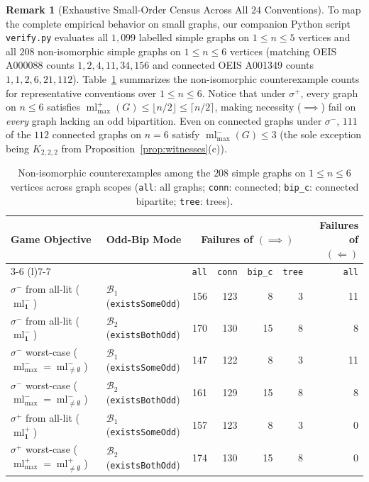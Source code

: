 \documentclass[11pt,a4paper]{article}
\theoremstyle{definition}
\newtheorem{remark}[theorem]{Remark}
\newcommand{\ml}{\operatorname{ml}}
\newcommand{\ceilhalf}[1]{\lceil #1 / 2 \rceil}
\newcommand{\floorhalf}[1]{\lfloor #1 / 2 \rfloor}
\begin{document}
\begin{remark}[Exhaustive Small-Order Census Across All $24$ Conventions]
To map the complete empirical behavior on small graphs, our companion Python script
\texttt{verify.py} evaluates all $1{,}099$ labelled simple graphs on $1 \le n \le 5$
vertices and all $208$ non-isomorphic simple graphs on $1 \le n \le 6$ vertices
(matching OEIS A000088 counts $1, 2, 4, 11, 34, 156$ and connected OEIS A001349
counts $1, 1, 2, 6, 21, 112$). Table~\ref{tab:census} summarizes the non-isomorphic
counterexample counts for representative conventions over $1 \le n \le 6$. Notice
that under $\sigma^+$, every graph on $n \le 6$ satisfies $\ml_{\max}^+(G) \le \floorhalf{n} \le \ceilhalf{n}$,
making necessity ($\implies$) fail on \emph{every} graph lacking an odd bipartition.
Even on connected graphs under $\sigma^-$, $111$ of the $112$ connected graphs on
$n = 6$ satisfy $\ml_{\max}^-(G) \le 3$ (the sole exception being $K_{2,2,2}$ from
Proposition~\ref{prop:witnesses}(c)).
\end{remark}

\begin{table}[ht]
\centering
\small
\caption{Non-isomorphic counterexamples among the $208$ simple graphs on $1 \le n \le 6$
vertices across graph scopes (\texttt{all}: all graphs; \texttt{conn}: connected;
\texttt{bip\_c}: connected bipartite; \texttt{tree}: trees).}
\label{tab:census}
\begin{tabular}{@{}llrrrrr@{}}
\toprule
Game Objective & Odd-Bip Mode & \multicolumn{4}{c}{Failures of $(\implies)$} & Failures of $(\Longleftarrow)$ \\
\cmidrule(lr){3-6} \cmidrule(l){7-7}
 & & \texttt{all} & \texttt{conn} & \texttt{bip\_c} & \texttt{tree} & \texttt{all} \\
\midrule
$\sigma^-$ from all-lit ($\ml_{\mathbf{1}}^-$) & $\mathcal{B}_1$ (\texttt{existsSomeOdd}) & 156 & 123 & 8 & 3 & 11 \\
$\sigma^-$ from all-lit ($\ml_{\mathbf{1}}^-$) & $\mathcal{B}_2$ (\texttt{existsBothOdd}) & 170 & 130 & 15 & 8 & 8 \\
$\sigma^-$ worst-case ($\ml_{\max}^- = \ml_{\neq\emptyset}^-$) & $\mathcal{B}_1$ (\texttt{existsSomeOdd}) & 147 & 122 & 8 & 3 & 11 \\
$\sigma^-$ worst-case ($\ml_{\max}^- = \ml_{\neq\emptyset}^-$) & $\mathcal{B}_2$ (\texttt{existsBothOdd}) & 161 & 129 & 15 & 8 & 8 \\
$\sigma^+$ from all-lit ($\ml_{\mathbf{1}}^+$) & $\mathcal{B}_1$ (\texttt{existsSomeOdd}) & 157 & 123 & 8 & 3 & 0 \\
$\sigma^+$ worst-case ($\ml_{\max}^+ = \ml_{\neq\emptyset}^+$) & $\mathcal{B}_2$ (\texttt{existsBothOdd}) & 174 & 130 & 15 & 8 & 0 \\
\bottomrule
\end{tabular}
\end{table}
\end{document}
